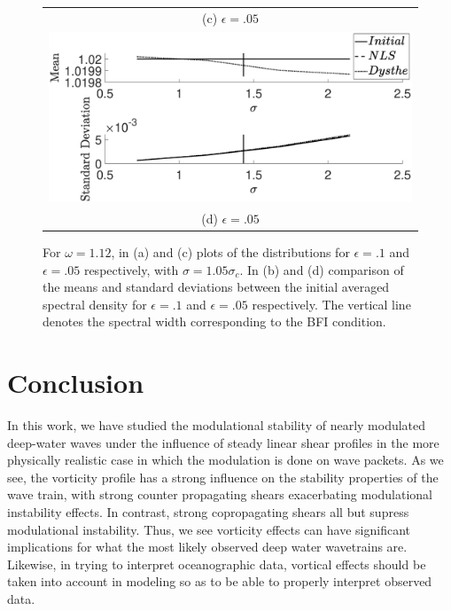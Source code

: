 \documentclass[a4paper,11pt]{article}
\begin{document}
\begin{figure}[!ht]
\begin{tabular}{c}
(c) $\epsilon=.05$ \\
\includegraphics[width=.65\textwidth]{omega_1pt12_mean_std_plot_ep_pt05}\\
(d) $\epsilon=.05$
\end{tabular}
\caption{For $\omega=1.12$, in (a) and (c) plots of the distributions for $\epsilon=.1$ and $\epsilon=.05$ respectively,  with $\sigma=1.05\sigma_{c}$.  In (b) and (d) comparison of the means and standard deviations between the initial averaged spectral density for $\epsilon=.1$ and $\epsilon=.05$ respectively.  The vertical line denotes the spectral width corresponding to the BFI condition.}
\label{fig:meanstdom1}
\end{figure}

\section*{Conclusion}

In this work, we have studied the modulational stability of nearly modulated deep-water waves under the influence of steady linear shear profiles in the more physically realistic case in which the modulation is done on wave packets.  As we see, the vorticity profile has a strong influence on the stability properties of the wave train, with strong counter propagating shears exacerbating modulational instability effects.  In contrast, strong copropagating shears all but supress modulational instability.  Thus, we see vorticity effects can have significant implications for what the most likely observed deep water wavetrains are.  Likewise, in trying to interpret oceanographic data, vortical effects should be taken into account in modeling so as to be able to properly interpret observed data.    




\end{document}
